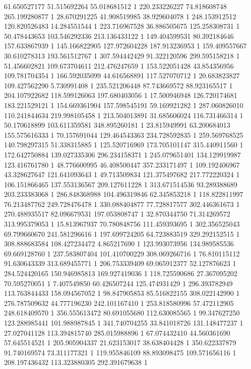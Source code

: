 61.650527177	51.515692264	55.018681512	1
220.233226227	74.818608748	265.199280877	1
28.670291225	41.908519985	38.929604078	1
248.153912512	120.820526483	14.284551544	1
223.716967528	36.886505675	125.258308731	1
50.478443653	103.546292336	213.136433122	1
149.404599531	80.392184646	157.633867939	1
145.166822905	127.972604228	187.913236953	1
159.409557667	30.610278313	193.561512767	1
307.594442429	91.322120596	299.595158218	1
51.456602821	109.673704611	212.476247659	1
153.522051428	43.854356956	109.781704354	1
166.592035099	44.616568891	117.527070712	1
20.683823827	109.427562290	5.730991408	1
235.521206448	87.743669572	88.923165517	1
204.107922682	118.599126063	197.680403056	1
17.500946948	126.720174681	183.221529121	1
154.669361904	157.598545191	59.169921282	1
287.060826010	110.241844634	219.998105458	1
213.504013891	31.685606024	116.731466314	1
50.170618899	103.611359581	348.895260181	1
23.815949991	63.200684013	155.575616333	1
70.157691044	129.464543363	234.728592835	1
259.569768525	140.798297315	51.338315885	1
125.520716969	173.705101147	315.440911560	1
172.642750884	139.027335306	296.234158371	1
245.079651401	134.129919987	123.416761780	1
48.776600995	46.408500447	357.233171497	1
109.192406967	43.328627647	121.641093643	1
49.713509834	121.375497682	217.772220324	1
106.151866465	137.553136567	209.127611228	1
313.671514536	93.289388689	203.233383068	1
286.848368988	104.496319846	62.345853218	1
118.822811997	76.213487762	249.728476478	1
330.088404877	77.728817577	302.446361673	1
270.488935517	82.096679531	197.053808747	1
32.870344750	71.314269572	313.995379053	1
15.813967937	70.780848756	111.459393695	1
302.356525043	69.799660670	241.581296616	1
197.699724205	64.723883519	329.292152515	1
308.888683584	108.427234472	4.865217690	1
123.993073956	134.989585536	69.669128760	1
237.583807404	101.410700229	308.069266716	1
76.810115112	91.630643339	313.689455771	1
206.753339409	69.065912377	52.127876623	1
284.524420165	150.946985813	169.927419036	1
118.725590686	27.367095202	70.595270051	1
7.407549850	60.426507244	125.474931429	1
296.393782949	113.763844433	158.094567052	1
98.847905853	85.516822155	308.022142990	1
276.787509632	44.777196230	242.101167410	1
253.818580996	57.472112905	248.618409570	1
356.555613472	80.691055680	112.630085565	1
99.347627250	123.288985441	101.988987845	1
341.740704255	33.841018726	131.148477237	1
27.027041128	113.394815740	285.015988896	1
67.074432410	44.560361690	57.645514521	1
205.905904337	21.623153017	38.638404428	1
350.622337879	91.740169574	73.311177321	1
119.955846109	88.893098475	109.571656116	1
208.197436432	113.323880305	292.391679638	1
